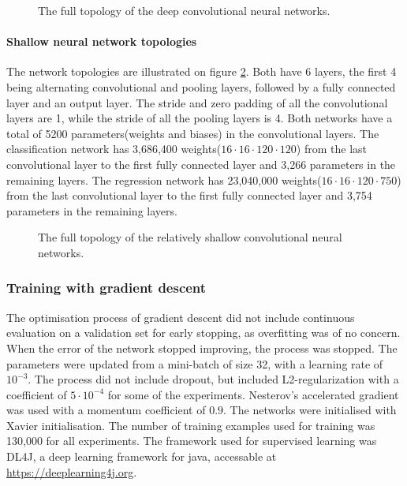 \begin{figure}[H]
	\vspace{-8mm}
	\begin{center}
	\begin{scriptsize}
		\sffamily
		\def\svgwidth{0.95\textwidth}
		
	\end{scriptsize}
	\end{center}
	\caption{The full topology of the deep convolutional neural networks.}
	\label{fig:architectureOfDeepNet}
\end{figure}

\paragraph{Shallow neural network topologies}
The network topologies are illustrated on figure \ref{fig:architectureOfShallowNet}. Both have 6 layers, the first 4 being alternating convolutional and pooling layers, followed by a fully connected layer and an output layer.  The stride and zero padding of all the convolutional layers are 1, while the stride of all the pooling layers is 4. Both networks have a total of 5200 parameters(weights and biases) in the convolutional layers.
The classification network has 3,686,400 weights($16 \cdot 16 \cdot 120 \cdot 120$) from the last convolutional layer to the first fully connected layer and 3,266 parameters in the remaining layers.
The regression network has 23,040,000 weights($16 \cdot 16 \cdot 120 \cdot 750$) from the last convolutional layer to the first fully connected layer and 3,754 parameters in the remaining layers.

\begin{figure}[H]
	\begin{scriptsize}
		\sffamily
		\def\svgwidth{\textwidth}
		
	\end{scriptsize}
	\caption{The full topology of the relatively shallow convolutional neural networks.}
	\label{fig:architectureOfShallowNet}
\end{figure}

\subsubsection{Training with gradient descent}
The optimisation process of gradient descent did not include continuous evaluation on a validation set for early stopping, as overfitting was of no concern. When the error of the network stopped improving, the process was stopped. The parameters were updated from a mini-batch of size 32, with a learning rate of $10^{-3}$. The process did not include dropout, but included L2-regularization with a coefficient of $5 \cdot 10^{-4}$ for some of the experiments. Nesterov's accelerated gradient was used with a momentum coefficient of $0.9$. The networks were initialised with Xavier initialisation. The number of training examples used for training was 130,000 for all experiments. The framework used for supervised learning was DL4J, a deep learning framework for java, accessable at \url{https://deeplearning4j.org}.

